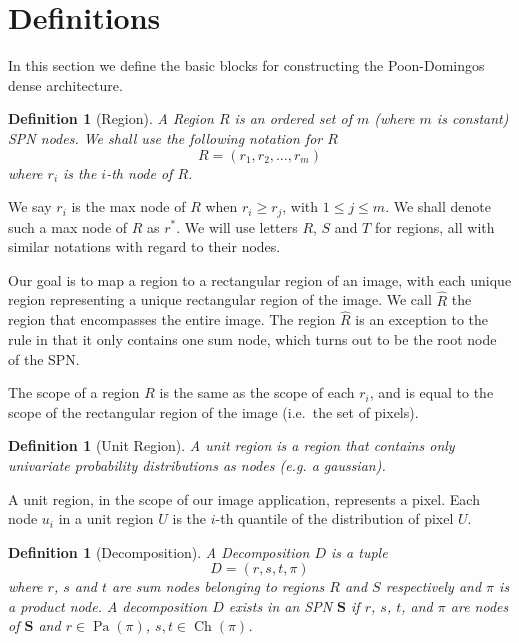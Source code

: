 \documentclass{amsart}
\DeclareMathOperator*{\Ch}{\text{Ch}}
\DeclareMathOperator*{\Pa}{\text{Pa}}
\theoremstyle{plain}
\newcounter{dummy-def}\numberwithin{dummy-def}{section}
\newtheorem{definition}[dummy-def]{Definition}
\newcounter{dummy-thm}\numberwithin{dummy-thm}{section}
\newcounter{dummy-prop}\numberwithin{dummy-prop}{section}
\newcounter{dummy-corollary}\numberwithin{dummy-corollary}{section}
\newcounter{dummy-lemma}\numberwithin{dummy-lemma}{section}
\newcounter{dummy-ex}\numberwithin{dummy-ex}{section}
\newcounter{dummy-eg}\numberwithin{dummy-eg}{section}
\numberwithin{equation}{section}
\begin{document}
\section{Definitions}

In this section we define the basic blocks for constructing the Poon-Domingos dense architecture.

\begin{definition}[Region]
  A Region $R$ is an ordered set of $m$ (where $m$ is constant) SPN nodes. We shall use the
  following notation for $R$
  \begin{equation*}
    R = (r_1,r_2,\ldots,r_m)
  \end{equation*}
  where $r_i$ is the $i$-th node of $R$.
\end{definition}

We say $r_i$ is the max node of $R$ when $r_i\geq r_j$, with $1\leq j\leq m$. We shall denote such a
max node of $R$ as $r^*$. We will use letters $R$, $S$ and $T$ for regions, all with similar
notations with regard to their nodes.

Our goal is to map a region to a rectangular region of an image, with each unique region
representing a unique rectangular region of the image. We call $\hat{R}$ the region that
encompasses the entire image. The region $\hat{R}$ is an exception to the rule in that it only
contains one sum node, which turns out to be the root node of the SPN\@.

The scope of a region $R$ is the same as the scope of each $r_i$, and is equal to the scope of the
rectangular region of the image (i.e.\ the set of pixels).

\begin{definition}[Unit Region]
  A unit region is a region that contains only univariate probability distributions as nodes (e.g.
  a gaussian).
\end{definition}

A unit region, in the scope of our image application, represents a pixel. Each node $u_i$ in a unit
region $U$ is the $i$-th quantile of the distribution of pixel $U$.

\begin{definition}[Decomposition]
  A Decomposition $D$ is a tuple
  \begin{equation*}
    D = (r, s, t, \pi)
  \end{equation*}
  where $r$, $s$ and $t$ are sum nodes belonging to regions $R$ and $S$ respectively and $\pi$ is a
  product node. A decomposition $D$ exists in an SPN $\mathbf{S}$ if $r$, $s$, $t$, and $\pi$ are
  nodes of $\mathbf{S}$ and $r\in\Pa(\pi)$, $s,t\in\Ch(\pi)$.
\end{definition}
\end{document}
